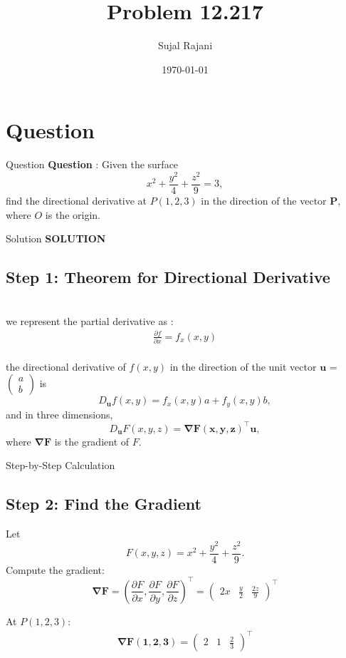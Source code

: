 \documentclass{beamer}
\title{Problem 12.217}
\author{Sujal Rajani}
\date{\today}
\let\vec\mathbf
\theoremstyle{remark}
\newcommand{\myvec}[1]{\ensuremath{\begin{pmatrix}#1\end{pmatrix}}}
\numberwithin{equation}{section}
\begin{document}
\begin{frame}
\titlepage
\end{frame}

\section{Question}
\begin{frame}{Question}
\textbf{Question }:
Given the surface
\[
x^2 + \frac{y^2}{4} + \frac{z^2}{9} = 3,
\]
find the directional derivative at \(P(1,2,3)\) in the direction of the vector $\vec{P}$, where \(O\) is the origin.

\end{frame}
\begin{frame}{Solution}
\textbf{SOLUTION}
\subsection*{Step 1: Theorem for Directional Derivative}
\\
we represent the partial derivative as :
\\
\begin{align*}
    \frac{\partial f}{\partial x}=f_x(x,y)
\end{align*} 
\\
 the directional derivative of \(f(x, y)\) in the direction of the unit vector $\vec{u}$ =  \myvec{a\\ b} is
\[
D_{\mathbf{u}} f(x, y) = f_x(x, y)a + f_y(x, y)b,
\]
and in three dimensions,
\[
D_{\mathbf{u}} F(x, y, z) = \vec{\nabla F(x, y, z)}^\top  \vec{u},
\]
where $\vec{\nabla F}$ is the gradient of \(F\).
     \end{frame}
     \begin{frame}{ Step-by-Step Calculation}    
\subsection*{Step 2: Find the Gradient}

Let
\[
F(x, y, z) = x^2 + \frac{y^2}{4} + \frac{z^2}{9}.
\]
Compute the gradient:
\[
\vec{\nabla F} = \left( \frac{\partial F}{\partial x}, \frac{\partial F}{\partial y}, \frac{\partial F}{\partial z} \right)^\top
= \myvec{2x& \frac{y}{2}& \frac{2z}{9}}^\top
\]

At \(P(1,2,3)\):
\begin{align*}
\vec{\nabla F(1,2,3)} =  \myvec{2&1&\frac{2}{3}}^\top
\end{align*}
     \end{frame}
\end{document}
